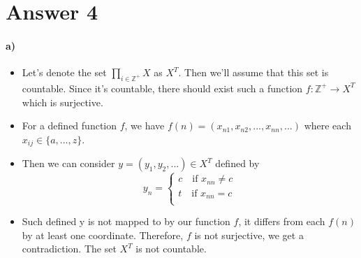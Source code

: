 \documentclass[12pt]{article}
\begin{document}
\section*{Answer 4}
\paragraph*{a)}
\begin{itemize}
            \item Let's denote the set $\prod\nolimits_{i \in \mathbb{Z}^+} X$ as $X^T$. Then we'll assume that this set is countable. Since it's countable, there should exist such a function $f: \mathbb{Z}^+ \rightarrow X^T$ which is surjective.
            \item For a defined function $f$, we have $f(n) = (x_{n1}, x_{n2}, ..., x_{nn}, ...)$ where each $x_{ij} \in \{a,...,z\}$.
            \item Then we can consider $y = (y_1, y_2, ...) \in X^T$ defined by
            $$
                y_n=
                \begin{cases}
                    c \quad \text{if } x_{nn} \neq c\\
                    t \quad \text{if } x_{nn} = c\\
                \end{cases}
            $$
            \item Such defined y is not mapped to by our function $f$, it differs from each $f(n)$ by at least one coordinate. Therefore, $f$ is not surjective, we get a contradiction. The set $X^T$ is not countable.

\end{itemize}{}
\end{document}
